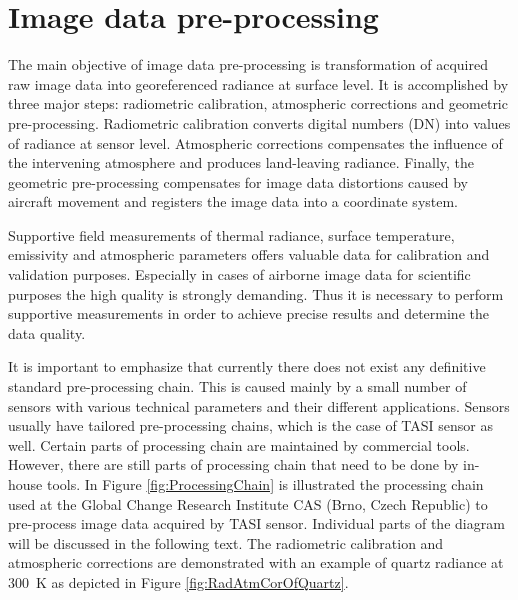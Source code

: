 \section{Image data pre-processing}

The main objective of image data pre-processing is transformation of acquired raw image data into georeferenced radiance at surface level. It is accomplished by three major steps: radiometric calibration, atmospheric corrections and geometric pre-processing. Radiometric calibration converts digital numbers (DN) into values of radiance at sensor level. Atmospheric corrections compensates the influence of the intervening atmosphere and produces land-leaving radiance. Finally, the geometric pre-processing compensates for image data distortions caused by aircraft movement and registers the image data into a coordinate system.

Supportive field measurements of thermal radiance, surface temperature, emissivity and atmospheric parameters offers valuable data for calibration and validation purposes. Especially in cases of airborne image data for scientific purposes the high quality is strongly demanding. Thus it is necessary to perform supportive measurements in order to achieve precise results and determine the data quality.

It is important to emphasize that currently there does not exist any definitive standard pre-processing chain. This is caused mainly by a small number of sensors with various technical parameters and their different applications. Sensors usually have tailored pre-processing chains, which is the case of TASI sensor as well. Certain parts of processing chain are maintained by commercial tools. However, there are still parts of processing chain that need to be done by in-house tools. In Figure \ref{fig:ProcessingChain} is illustrated the processing chain used at the Global Change Research Institute CAS (Brno, Czech Republic) to pre-process image data acquired by TASI sensor. Individual parts of the diagram will be discussed in the following text. The radiometric calibration and atmospheric corrections are demonstrated with an example of quartz radiance at \SI{300}{\kelvin} as depicted in Figure \ref{fig:RadAtmCorOfQuartz}.

